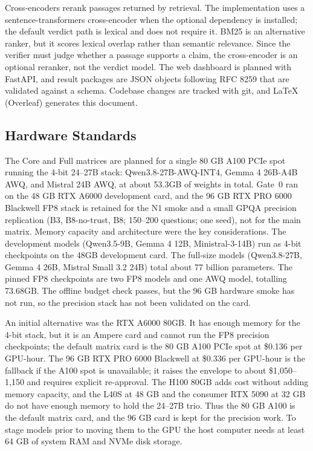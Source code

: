 Cross-encoders rerank passages returned by retrieval. The implementation uses a sentence-transformers cross-encoder when the optional dependency is installed; the default verdict path is lexical and does not require it. BM25 is an alternative ranker, but it scores lexical overlap rather than semantic relevance. Since the verifier must judge whether a passage supports a claim, the cross-encoder is an optional reranker, not the verdict model. The web dashboard is planned with FastAPI, and result packages are JSON objects following RFC 8259 that are validated against a schema. Codebase changes are tracked with git, and LaTeX (Overleaf) generates this document.

\subsection{Hardware Standards}

The Core and Full matrices are planned for a single 80 GB A100 PCIe spot running the 4-bit 24--27B stack: Qwen3.8-27B-AWQ-INT4, Gemma 4 26B-A4B AWQ, and Mistral 24B AWQ, at about 53.3GB of weights in total. Gate~0 ran on the 48 GB RTX A6000 development card, and the 96 GB RTX PRO 6000 Blackwell FP8 stack is retained for the N1 smoke and a small GPQA precision replication (B3, B8-no-trust, B8; 150--200 questions; one seed), not for the main matrix. Memory capacity and architecture were the key considerations. The development models (Qwen3.5-9B, Gemma 4 12B, Ministral-3-14B) run as 4-bit checkpoints on the 48GB development card. The full-size models (Qwen3.8-27B, Gemma 4 26B, Mistral Small 3.2 24B) total about 77 billion parameters. The pinned FP8 checkpoints are two FP8 models and one AWQ model, totalling 73.68GB. The offline budget check passes, but the 96 GB hardware smoke has not run, so the precision stack has not been validated on the card.

An initial alternative was the RTX A6000 80GB. It has enough memory for the 4-bit stack, but it is an Ampere card and cannot run the FP8 precision checkpoints; the default matrix card is the 80 GB A100 PCIe spot at \$0.136 per GPU-hour. The 96 GB RTX PRO 6000 Blackwell at \$0.336 per GPU-hour is the fallback if the A100 spot is unavailable; it raises the envelope to about \$1,050--1,150 and requires explicit re-approval. The H100 80GB adds cost without adding memory capacity, and the L40S at 48 GB and the consumer RTX 5090 at 32 GB do not have enough memory to hold the 24--27B trio. Thus the 80 GB A100 is the default matrix card, and the 96 GB card is kept for the precision work. To stage models prior to moving them to the GPU the host computer needs at least 64 GB of system RAM and NVMe disk storage.

